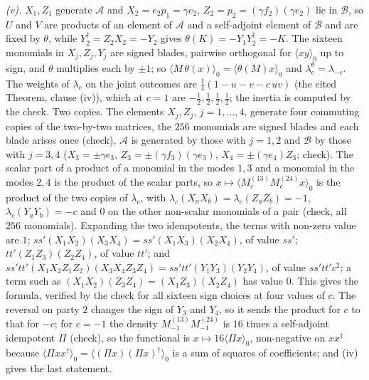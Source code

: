 \emph{(v).} $X_{1}, Z_{1}$ generate $\mathcal{A}$ and $X_{2} = e_{2}p_{1} = \gamma e_{2}$, $Z_{2} = p_{2} = (\gamma f_{2})(\gamma e_{2})$ lie in $\mathcal{B}$, so $U$ and $V$ are products of an element of $\mathcal{A}$ and a self-adjoint element of $\mathcal{B}$ and are fixed by $\theta$, while $Y_{2}^{\dagger} = Z_{2}X_{2} = -Y_{2}$ gives $\theta(K) = -Y_{1}Y_{2}^{\dagger} = -K$. The sixteen monomials in $X_{j}, Z_{j}, Y_{j}$ are signed blades, pairwise orthogonal for $\langle xy\rangle_{0}$ up to sign, and $\theta$ multiplies each by $\pm 1$; so $\langle M\,\theta(x)\rangle_{0} = \langle\theta(M)x\rangle_{0}$ and $\lambda_{c}^{\theta} = \lambda_{-c}$. The weights of $\lambda_{c}$ on the joint outcomes are $\tfrac14(1 - u - v - c\,uv)$ (the cited Theorem, clause (iv)), which at $c = 1$ are $-\tfrac12, \tfrac12, \tfrac12, \tfrac12$; the inertia is computed by the check. Two copies. The elements $X_{j}, Z_{j}$, $j = 1, \dots, 4$, generate four commuting copies of the two-by-two matrices, the $256$ monomials are signed blades and each blade arises once (check), $\mathcal{A}$ is generated by those with $j = 1, 2$ and $\mathcal{B}$ by those with $j = 3, 4$ ($X_{3} = \pm\gamma e_{3}$, $Z_{3} = \pm(\gamma f_{3})(\gamma e_{3})$, $X_{4} = \pm(\gamma e_{4})Z_{3}$; check). The scalar part of a product of a monomial in the modes $1, 3$ and a monomial in the modes $2, 4$ is the product of the scalar parts, so $x \mapsto \langle M^{(13)}_{c}M^{(24)}_{c}x\rangle_{0}$ is the product of the two copies of $\lambda_{c}$, with $\lambda_{c}(X_{a}X_{b}) = \lambda_{c}(Z_{a}Z_{b}) = -1$, $\lambda_{c}(Y_{a}Y_{b}) = -c$ and $0$ on the other non-scalar monomials of a pair (check, all $256$ monomials). Expanding the two idempotents, the terms with non-zero value are $1$; $ss'(X_{1}X_{2})(X_{3}X_{4}) = ss'(X_{1}X_{3})(X_{2}X_{4})$, of value $ss'$; $tt'(Z_{1}Z_{3})(Z_{2}Z_{4})$, of value $tt'$; and $ss'tt'(X_{1}X_{2}Z_{1}Z_{2})(X_{3}X_{4}Z_{3}Z_{4}) = ss'tt'(Y_{1}Y_{3})(Y_{2}Y_{4})$, of value $ss'tt'c^{2}$; a term such as $(X_{1}X_{2})(Z_{3}Z_{4}) = (X_{1}Z_{3})(X_{2}Z_{4})$ has value $0$. This gives the formula, verified by the check for all sixteen sign choices at four values of $c$. The reversal on party $2$ changes the sign of $Y_{3}$ and $Y_{4}$, so it sends the product for $c$ to that for $-c$; for $c = -1$ the density $M^{(13)}_{-1}M^{(24)}_{-1}$ is $16$ times a self-adjoint idempotent $\Pi$ (check), so the functional is $x \mapsto 16\langle\Pi x\rangle_{0}$, non-negative on $xx^{\dagger}$ because $\langle\Pi xx^{\dagger}\rangle_{0} = \langle(\Pi x)(\Pi x)^{\dagger}\rangle_{0}$ is a sum of squares of coefficients; and (iv) gives the last statement.


